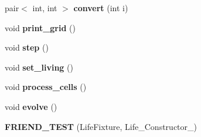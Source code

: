 \begin{DoxyCompactItemize}
\item 
\hypertarget{classLife_ad94ec4c8e59c2defd69cb812bf3f1b95}{pair$<$ int, int $>$ {\bfseries convert} (int i)}\label{classLife_ad94ec4c8e59c2defd69cb812bf3f1b95}

\item 
\hypertarget{classLife_a747a109435a599db7dbcef99cc83d42c}{void {\bfseries print\-\_\-grid} ()}\label{classLife_a747a109435a599db7dbcef99cc83d42c}

\item 
\hypertarget{classLife_a34cdf0c8bec9334a20c9eafadc967a52}{void {\bfseries step} ()}\label{classLife_a34cdf0c8bec9334a20c9eafadc967a52}

\item 
\hypertarget{classLife_a05eee381f80732bee4e16d1fe0863dac}{void {\bfseries set\-\_\-living} ()}\label{classLife_a05eee381f80732bee4e16d1fe0863dac}

\item 
\hypertarget{classLife_aedd5f65664d05a8dbfaa012eb9c5d4ab}{void {\bfseries process\-\_\-cells} ()}\label{classLife_aedd5f65664d05a8dbfaa012eb9c5d4ab}

\item 
\hypertarget{classLife_aa9adce7420176d9b06437acbcedc4cdf}{void {\bfseries evolve} ()}\label{classLife_aa9adce7420176d9b06437acbcedc4cdf}

\item 
\hypertarget{classLife_a7eb3bd1c61d0c047b1c74f1d22367094}{{\bfseries F\-R\-I\-E\-N\-D\-\_\-\-T\-E\-S\-T} (Life\-Fixture, Life\-\_\-\-Constructor\-\_)}\label{classLife_a7eb3bd1c61d0c047b1c74f1d22367094}

\end{DoxyCompactItemize}
